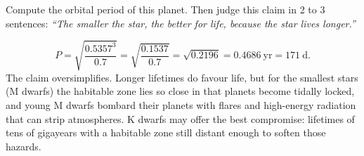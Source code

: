 \parti {} Compute the orbital period of this planet.
Then judge this claim in 2 to 3 sentences:
\emph{``The smaller the star, the better for life, because the star lives longer.''}

\begin{solution}
\[
  P = \sqrt{\frac{0.5357^3}{0.7}} = \sqrt{\frac{0.1537}{0.7}} = \sqrt{0.2196} = 0.4686\ \mathrm{yr} = 171\ \mathrm{d}.
\]
The claim oversimplifies.
Longer lifetimes do favour life, but for the smallest stars (M dwarfs) the habitable zone lies so close in that planets become tidally locked, and young M dwarfs bombard their planets with flares and high-energy radiation that can strip atmospheres.
K dwarfs may offer the best compromise: lifetimes of tens of gigayears with a habitable zone still distant enough to soften those hazards.
\end{solution}
